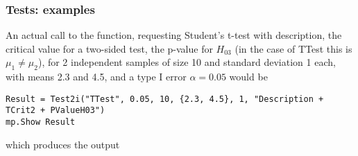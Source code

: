 %
%
%
%
%
%



\subsubsection{Tests: examples}
An actual call to the function, requesting Student's t-test with description, the critical value for a two-sided test, the p-value for $H_{03}$ (in the case of \textsf{TTest} this is $\mu_1 \neq \mu_2$), for 2 independent samples of size 10 and standard deviation 1 each, with means 2.3 and 4.5, and a type I error $\alpha=0.05$ would be

\begin{lstlisting}
Result = Test2i("TTest", 0.05, 10, {2.3, 4.5}, 1, "Description + TCrit2 + PValueH03")
mp.Show Result
\end{lstlisting}
which produces the output

